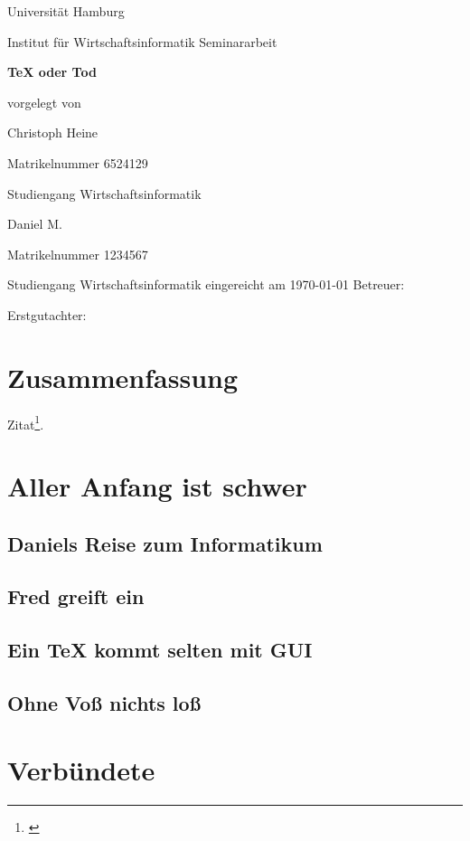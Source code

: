 \documentclass[12pt]{scrartcl}
\begin{document}
	
	\newpage
	\thispagestyle{empty}
	\begin{center}\Large
		Universität Hamburg \par
		Institut für Wirtschaftsinformatik
		\vfill
		Seminararbeit
		\vfill
		{\Large\textsf{\textbf{TeX oder Tod}}\par}
		\vfill
		vorgelegt von 
		\par\bigskip
		Christoph Heine \par
		Matrikelnummer 6524129 \par
		Studiengang Wirtschaftsinformatik \par
		Daniel M. \par
		Matrikelnummer 1234567 \par
		Studiengang Wirtschaftsinformatik
		\vfill
		eingereicht am \today
		\vfill 
		Betreuer:  \par
		Erstgutachter:  \par
	\end{center}
	
	\newpage
	\tableofcontents
	
	\newpage
	\section*{Zusammenfassung}
	Zitat\footnote{\cite{IEEE2013}}.
	
	\newpage
	\section{Aller Anfang ist schwer}
	\subsection{Daniels Reise zum Informatikum}
	\subsection{Fred greift ein}
	\subsection{Ein TeX kommt selten mit GUI}
	\subsection{Ohne Voß nichts loß}
	
	\newpage
	\section{Verbündete}
\end{document}
